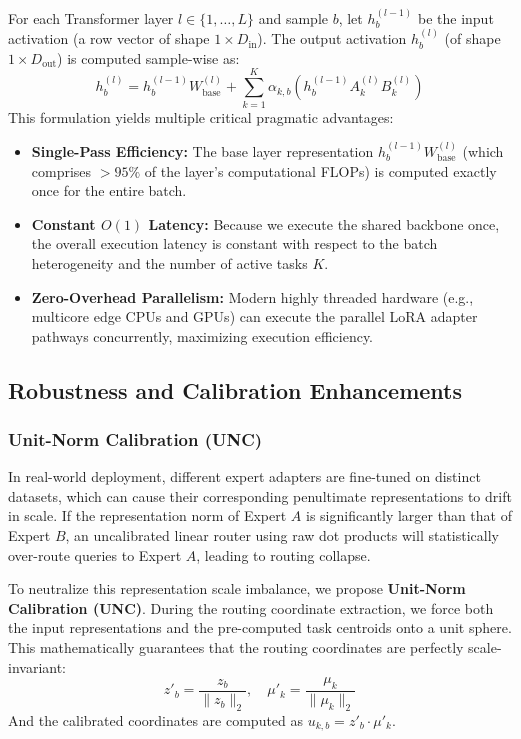 For each Transformer layer $l \in \{1, \dots, L\}$ and sample $b$, let $h_b^{(l-1)}$ be the input activation (a row vector of shape $1 \times D_{\text{in}}$). The output activation $h_b^{(l)}$ (of shape $1 \times D_{\text{out}}$) is computed sample-wise as:
\begin{equation}
    h_b^{(l)} = h_b^{(l-1)} W_{\text{base}}^{(l)} + \sum_{k=1}^K \alpha_{k, b} \left( h_b^{(l-1)} A_k^{(l)} B_k^{(l)} \right)
\end{equation}
This formulation yields multiple critical pragmatic advantages:
\begin{itemize}
    \item \textbf{Single-Pass Efficiency:} The base layer representation $h_b^{(l-1)} W_{\text{base}}^{(l)}$ (which comprises $>95\%$ of the layer's computational FLOPs) is computed exactly once for the entire batch.
    \item \textbf{Constant $O(1)$ Latency:} Because we execute the shared backbone once, the overall execution latency is constant with respect to the batch heterogeneity and the number of active tasks $K$.
    \item \textbf{Zero-Overhead Parallelism:} Modern highly threaded hardware (e.g., multicore edge CPUs and GPUs) can execute the parallel LoRA adapter pathways concurrently, maximizing execution efficiency.
\end{itemize}

\subsection{Robustness and Calibration Enhancements}

\subsubsection{Unit-Norm Calibration (UNC)}
In real-world deployment, different expert adapters are fine-tuned on distinct datasets, which can cause their corresponding penultimate representations to drift in scale. If the representation norm of Expert $A$ is significantly larger than that of Expert $B$, an uncalibrated linear router using raw dot products will statistically over-route queries to Expert $A$, leading to routing collapse.

To neutralize this representation scale imbalance, we propose \textbf{Unit-Norm Calibration (UNC)}. During the routing coordinate extraction, we force both the input representations and the pre-computed task centroids onto a unit sphere. This mathematically guarantees that the routing coordinates are perfectly scale-invariant:
\begin{equation}
    z'_b = \frac{z_b}{\|z_b\|_2}, \quad \mu'_k = \frac{\mu_k}{\|\mu_k\|_2}
\end{equation}
And the calibrated coordinates are computed as $u_{k, b} = z'_b \cdot \mu'_k$.

